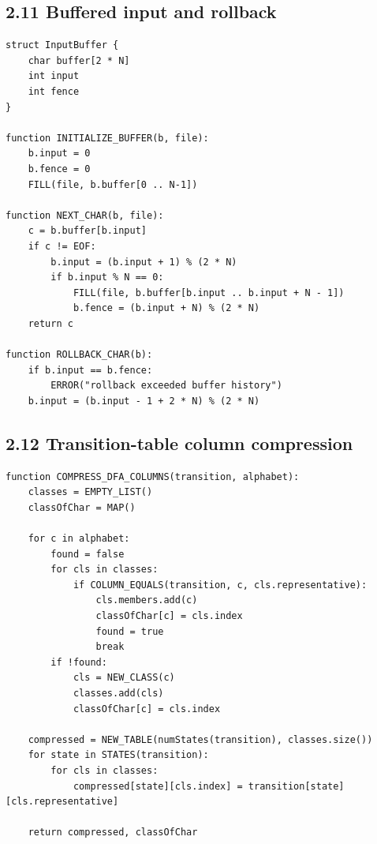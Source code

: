 \documentclass[10pt,letterpaper]{article}
\begin{document}
\subsection*{2.11 Buffered input and rollback}
{}

\begin{verbatim}
struct InputBuffer {
    char buffer[2 * N]
    int input
    int fence
}

function INITIALIZE_BUFFER(b, file):
    b.input = 0
    b.fence = 0
    FILL(file, b.buffer[0 .. N-1])

function NEXT_CHAR(b, file):
    c = b.buffer[b.input]
    if c != EOF:
        b.input = (b.input + 1) % (2 * N)
        if b.input % N == 0:
            FILL(file, b.buffer[b.input .. b.input + N - 1])
            b.fence = (b.input + N) % (2 * N)
    return c

function ROLLBACK_CHAR(b):
    if b.input == b.fence:
        ERROR("rollback exceeded buffer history")
    b.input = (b.input - 1 + 2 * N) % (2 * N)
\end{verbatim}

\subsection*{2.12 Transition-table column compression}
{}

\begin{verbatim}
function COMPRESS_DFA_COLUMNS(transition, alphabet):
    classes = EMPTY_LIST()
    classOfChar = MAP()

    for c in alphabet:
        found = false
        for cls in classes:
            if COLUMN_EQUALS(transition, c, cls.representative):
                cls.members.add(c)
                classOfChar[c] = cls.index
                found = true
                break
        if !found:
            cls = NEW_CLASS(c)
            classes.add(cls)
            classOfChar[c] = cls.index

    compressed = NEW_TABLE(numStates(transition), classes.size())
    for state in STATES(transition):
        for cls in classes:
            compressed[state][cls.index] = transition[state][cls.representative]

    return compressed, classOfChar
\end{verbatim}
\end{document}
